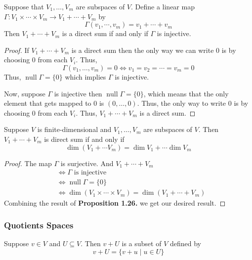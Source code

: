 \begin{proposition}
    Suppose that $V_1, \ldots, V_m$ are subspaces of $V$. Define a linear map $\Gamma : V_1 \times \cdots \times V_m \to V_1 + \cdots + V_m$
    by
    \[ \Gamma(v_1, \cdots, v_m) = v_1 + \cdots + v_m \]
    Then $V_1 + \cdots + V_m$ is a direct sum if and only if  $\Gamma$ is injective.
\end{proposition}

\begin{proof}
    If $V_1 + \cdots + V_m$ is a direct sum then the only way we can write $0$ is by choosing $0$ from each $V_i$. Thus,
    \[ \Gamma(v_1, \ldots, v_m) = 0 \iff v_1 = v_2 = \cdots = v_m = 0 \]
    Thus, $\operatorname{null} \Gamma = \{0\}$ which implies $\Gamma$ is injective.
    
    Now, suppose $\Gamma$ is injective then $\operatorname{null} \Gamma = \{0\}$, which means that the only element that gets mapped to $0$
    is $(0,\ldots,0)$. Thus, the only way to write $0$ is by choosing $0$ from each $V_i$. Thus, $V_1 + \cdots + V_m$ is a direct sum. 
\end{proof}

\begin{proposition}
    Suppose $V$ is finite-dimensional and $V_1, \ldots, V_m$ are subspaces of $V$. Then $V_1 + \cdots + V_m$ is direct sum if and only if
    \[ \dim (V_1 + \cdots V_m) = \dim V_1 + \cdots \dim V_m \]
\end{proposition}

\begin{proof}
    The map $\Gamma$ is surjective. And $V_1 + \cdots + V_m$  
    \begin{align*}
        & \iff \Gamma \text{ is injective} \\
        & \iff \operatorname{null} \Gamma = \{0\} \\
        & \iff \dim (V_1 \times \cdots \times V_m) = \dim(V_1 + \cdots + V_m)
    \end{align*}
    Combining the result of \textbf{Proposition 1.26.} we get our desired result.
\end{proof}


\subsubsection{Quotients Spaces}

\begin{definition}
    Suppose $v \in V$ and $U \subseteq V$. Then $v+U$ is a subset of $V$ defined by
    \[ v+U = \{v+u \mid u \in U\} \]
\end{definition}

